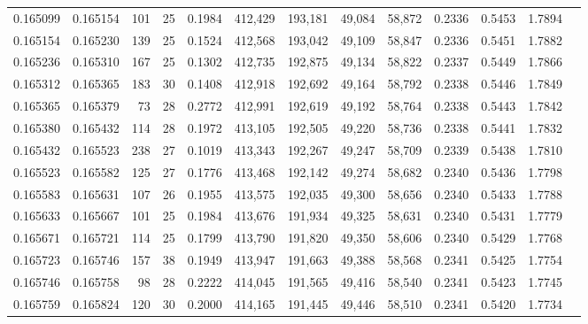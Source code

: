 \begin{tabular}{rrrrrrrrrrrrr}
0.165099 & 0.165154 & 101 &  25 &                                     0.1984 & 412,429 & 193,181 &  49,084 &  58,872 & 0.2336 & 0.5453 & 1.7894 \\
0.165154 & 0.165230 & 139 &  25 &                                     0.1524 & 412,568 & 193,042 &  49,109 &  58,847 & 0.2336 & 0.5451 & 1.7882 \\
0.165236 & 0.165310 & 167 &  25 &                                     0.1302 & 412,735 & 192,875 &  49,134 &  58,822 & 0.2337 & 0.5449 & 1.7866 \\
0.165312 & 0.165365 & 183 &  30 &                                     0.1408 & 412,918 & 192,692 &  49,164 &  58,792 & 0.2338 & 0.5446 & 1.7849 \\
0.165365 & 0.165379 &  73 &  28 &                                     0.2772 & 412,991 & 192,619 &  49,192 &  58,764 & 0.2338 & 0.5443 & 1.7842 \\
0.165380 & 0.165432 & 114 &  28 &                                     0.1972 & 413,105 & 192,505 &  49,220 &  58,736 & 0.2338 & 0.5441 & 1.7832 \\
0.165432 & 0.165523 & 238 &  27 &                                     0.1019 & 413,343 & 192,267 &  49,247 &  58,709 & 0.2339 & 0.5438 & 1.7810 \\
0.165523 & 0.165582 & 125 &  27 &                                     0.1776 & 413,468 & 192,142 &  49,274 &  58,682 & 0.2340 & 0.5436 & 1.7798 \\
0.165583 & 0.165631 & 107 &  26 &                                     0.1955 & 413,575 & 192,035 &  49,300 &  58,656 & 0.2340 & 0.5433 & 1.7788 \\
0.165633 & 0.165667 & 101 &  25 &                                     0.1984 & 413,676 & 191,934 &  49,325 &  58,631 & 0.2340 & 0.5431 & 1.7779 \\
0.165671 & 0.165721 & 114 &  25 &                                     0.1799 & 413,790 & 191,820 &  49,350 &  58,606 & 0.2340 & 0.5429 & 1.7768 \\
0.165723 & 0.165746 & 157 &  38 &                                     0.1949 & 413,947 & 191,663 &  49,388 &  58,568 & 0.2341 & 0.5425 & 1.7754 \\
0.165746 & 0.165758 &  98 &  28 &                                     0.2222 & 414,045 & 191,565 &  49,416 &  58,540 & 0.2341 & 0.5423 & 1.7745 \\
0.165759 & 0.165824 & 120 &  30 &                                     0.2000 & 414,165 & 191,445 &  49,446 &  58,510 & 0.2341 & 0.5420 & 1.7734 \\

\end{tabular}
